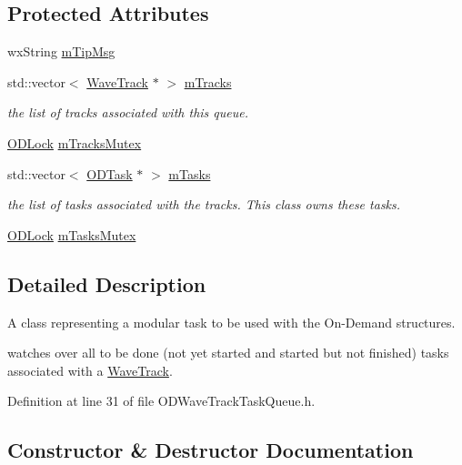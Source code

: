 \subsection*{Protected Attributes}
\begin{DoxyCompactItemize}
\item 
wx\+String \hyperlink{class_o_d_wave_track_task_queue_a19654517cedf1ee7b271dc543e439ea1}{m\+Tip\+Msg}
\item 
std\+::vector$<$ \hyperlink{class_wave_track}{Wave\+Track} $\ast$ $>$ \hyperlink{class_o_d_wave_track_task_queue_ac7ae645d36f3a3769316e929d84a3dd4}{m\+Tracks}
\begin{DoxyCompactList}\small\item\em the list of tracks associated with this queue. \end{DoxyCompactList}\item 
\hyperlink{class_o_d_lock}{O\+D\+Lock} \hyperlink{class_o_d_wave_track_task_queue_a100b3f3b1091b8abc5b30e3365f8e5b3}{m\+Tracks\+Mutex}
\item 
std\+::vector$<$ \hyperlink{class_o_d_task}{O\+D\+Task} $\ast$ $>$ \hyperlink{class_o_d_wave_track_task_queue_ac588566fcb4c38b49e2bd29f78ad92fb}{m\+Tasks}
\begin{DoxyCompactList}\small\item\em the list of tasks associated with the tracks. This class owns these tasks. \end{DoxyCompactList}\item 
\hyperlink{class_o_d_lock}{O\+D\+Lock} \hyperlink{class_o_d_wave_track_task_queue_a330f304c94aeca1402d1bfe1cc2870fa}{m\+Tasks\+Mutex}
\end{DoxyCompactItemize}


\subsection{Detailed Description}
A class representing a modular task to be used with the On-\/\+Demand structures. 

watches over all to be done (not yet started and started but not finished) tasks associated with a \hyperlink{class_wave_track}{Wave\+Track}. 

Definition at line 31 of file O\+D\+Wave\+Track\+Task\+Queue.\+h.



\subsection{Constructor \& Destructor Documentation}

